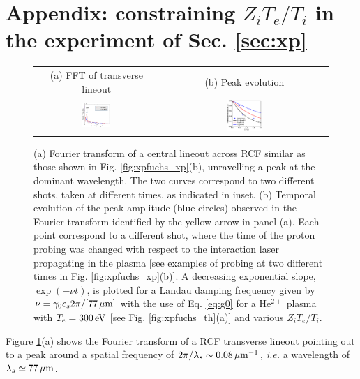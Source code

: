 \documentclass[
 reprint,
 superscriptaddress,
 amsmath,amssymb,
 aps,
]{revtex4-1}
\begin{document}
\appendix
\section*{Appendix: constraining $Z_iT_e/T_i$ in the experiment of Sec. \ref{sec:xp}}
\label{sec:ztesti}
\setcounter{equation}{0} 
\renewcommand{\theequation}{A\arabic{equation}}
\setcounter{figure}{0} 
\renewcommand{\thefigure}{A\arabic{figure}}
\begin{figure}
\begin{tabular}{cc}
(a) FFT of transverse lineout&
(b) Peak evolution\\
\includegraphics[width=0.24\textwidth]{fucshsfft.png}& 
\includegraphics[width=0.22\textwidth]{fuchsztesti.eps}
\end{tabular}
\caption{ \label{fig:xpfuchs_ap}  
(a) Fourier transform of a central lineout across RCF similar as those shown in Fig. \ref{fig:xpfuchs_xp}(b), unravelling a peak at the dominant wavelength. The two curves correspond to two different shots, taken at different times, as indicated in inset.
(b) Temporal evolution of the peak amplitude (blue circles) observed in the Fourier transform identified by the yellow arrow in panel (a). Each point correspond to a different shot, where the time of the proton probing was changed with respect to the interaction laser propagating in the plasma [see examples of probing at two different times in  Fig. \ref{fig:xpfuchs_xp}(b)]. A decreasing exponential slope,  $\exp(-\nu t)$, is plotted for a Landau damping frequency given by $\nu=\gamma_0c_s2\pi/[77\,\rm\mu m]$ with the use of  Eq. \eqref{eq:g0} for a He$^{2+}$ plasma with $T_e=300\,\rm eV$ [see Fig. \ref{fig:xpfuchs_th}(a)] and various $Z_iT_e/T_i$.
}
\end{figure}
Figure \ref{fig:xpfuchs_ap}(a) shows the Fourier transform of a RCF transverse lineout pointing out to a peak around a spatial frequency of  $2\pi/\lambda_s\sim 0.08\, \rm \mu m^{-1}$, \emph{i.e.} a wavelength of $\lambda_s \simeq 77\, \rm \mu m$.
\end{document}
